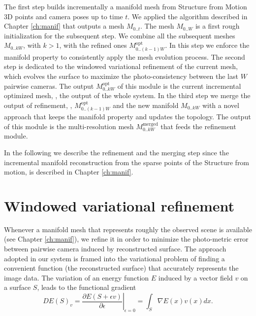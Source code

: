 The first step   builds incrementally a manifold mesh  from Structure from Motion 3D points and camera poses up to time $t$. We applied the algorithm described in Chapter \ref{ch:manif} that outputs a mesh $\mathit{M}_{0..t}$. The mesh  $\mathit{M}_{0..W}$ is a first rough initialization for the subsequent step. We combine all the subsequent meshes $\mathit{M}_{0..kW}$, with $k>1$, with the refined ones $\mathit{M}_{0..(k-1)W}^{\text{opt}}$. 
In this step we enforce the manifold property to consistently apply the mesh evolution process.
The second step is dedicated to the windowed variational refinement of the current mesh, which evolves the surface to maximize the photo-consistency between the last $W$ pairwise cameras.  
The output $\mathit{M}_{0..kW}^{\text{opt}}$ of this module is the current incremental optimized mesh, \ie, the output of the whole system.
In the third step we merge the output of refinement, \ie,   $\mathit{M}_{0..(k-1)W}^{\text{opt}}$  and the new manifold $\mathit{M}_{0..kW}$ with a novel approach that keeps the manifold property and updates the topology. 
The output of this module is the multi-resolution mesh $\mathit{M}_{0..kW}^{\text{merged}}$ that feeds the refinement module.

In the following we describe the refinement and the merging step since the incremental manifold reconstruction from the sparse points of the Structure from motion, is described in Chapter \ref{ch:manif}.

\section{Windowed variational refinement}
\label{sec:Incremental_photoconsistent}
Whenever a manifold mesh that represents roughly the observed scene is available (see Chapter \ref{ch:manif}), we refine it in order to minimize the photo-metric error between pairwise camera induced by reconstructed surface. 
The approach adopted in our system is framed into the variational problem of finding a convenient function (the reconstructed surface) that  accurately represents the image data.
The variation of an energy function $E$ induced by a vector field $v$ on a surface $\mathit{S}$, leads to the functional gradient
\begin{equation}
\label{eq::calculus}
 DE(\mathit{S})_v = \left.\frac{\partial E(\mathit{S} + \epsilon v)}{\partial \epsilon} \right|_{\epsilon=0} = \int_{\mathit{S}} \nabla E(x)v(x) dx.
\end{equation}

